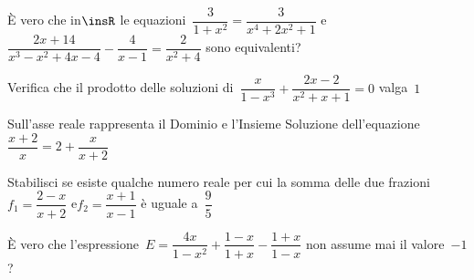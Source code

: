 \begin{esercizio}[\Ast]
 \label{ese:3.49}
È vero che in\(\insR\) le equazioni~\(\dfrac{3}{1 + x^{2}} = \dfrac{3}{x^{4} 
+2 x^{2} + 1}\) e~\(\dfrac{2 x + 14}{x^{3}-x^{2} + 4 x-4}-\dfrac{4}{x-1} 
=\dfrac{2}{x^{2} + 4}\) sono equivalenti?
\end{esercizio}

\begin{esercizio}[\Ast]
 \label{ese:3.50}
Verifica che il prodotto delle soluzioni di~\(\dfrac{x}{1-x^{3}} 
+ \dfrac{2 x-2}{x^{2} + x + 1}=0\) valga~\(1\)
\end{esercizio}

\begin{esercizio}[\Ast]
 \label{ese:3.51}
Sull'asse reale rappresenta il Dominio e l'Insieme Soluzione 
dell'equazione\\ 
\(\dfrac{x + 2}{x}=2+\dfrac{x}{x + 2}\)
\end{esercizio}

\begin{esercizio}[\Ast]
 \label{ese:3.52}
Stabilisci se esiste qualche numero reale per cui la somma delle due 
frazioni \\
\(f_{1}=\dfrac{2-x}{x + 2}\) e\(f_{2}=\dfrac{x + 1}{x-1}\) è uguale 
a~\(\dfrac{9}{5}\)
\end{esercizio}

\begin{esercizio}[\Ast]
 \label{ese:3.53}
È vero che l'espressione~\(E=\dfrac{4 x}{1-x^{2}} + \dfrac{1-x}{1 + 
x}-\dfrac{1 + x}{1-x}\) non assume mai il valore~\(-1\)?
\end{esercizio}

